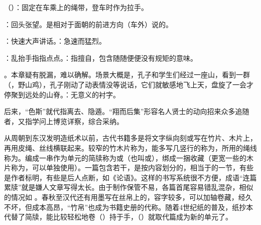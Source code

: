 {
\item {}（）：固定在车乘上的绳带，登车时作为拉手。
\item {}：回头张望。是相对于面朝的前进方向（车外）说的。
\item {}：快速大声讲话。：急速而猛烈。
\item {}：乱抬手指指点点。：指擅自，包含随随便便没有规矩的意味。
}
{}


{
\item {}。本章疑有脱漏，难以确解。场景大概是，孔子和学生们经过一座山，看到一群（，野山鸡），孔子刚动了动表情没等说话，它们就敏感地飞上天，盘旋了一会才停聚到远处的山脊。：无意义的衬字。


后来，“色斯”就代指离去、隐遁。“翔而后集”形容名人贤士的动向招来众多追随者，又指学问上博览详察，综合采纳。

从周朝到东汉发明造纸术以前，古代书籍多是将文字纵向刻或写在竹片、木片上，再用皮绳、丝线横联起来。较窄的竹木片称为，能多写几竖行的称为，所用的绳线称为。编成一串作为单元的简牍称为或（也叫或），绑成一捆收藏（更宽一些的木片称为，可以单独使用）。一篇包含若干，是按内容划分的，相当于的一节，有些是作者标明，有些是后人点断，如《论语》。这样的书写系统很不方便，成语“连篇累牍”就是嫌人文章写得太长。由于制作保管不易，各篇首尾容易错乱混杂，相似的情况如   。春秋至汉代还有用墨写在丝帛上的，容字较多，可以加轴卷藏，经久不坏，但成本高昂，“竹帛”也成为书籍史册的代称。随着4世纪纸的普及，纸抄本代替了简牍，能比较轻松地卷（）持于手，（）就取代篇成为新的单元了。

}
